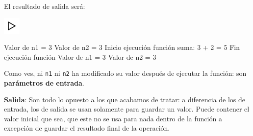 \documentclass[]{book}
\newenvironment{Shaded}{\begin{snugshade}}{\end{snugshade}}
\newcommand{\DataTypeTok}[1]{\textcolor[rgb]{0.13,0.29,0.53}{#1}}
\newcommand{\DecValTok}[1]{\textcolor[rgb]{0.00,0.00,0.81}{#1}}
\newcommand{\SpecialCharTok}[1]{\textcolor[rgb]{0.00,0.00,0.00}{#1}}
\newcommand{\StringTok}[1]{\textcolor[rgb]{0.31,0.60,0.02}{#1}}
\newcommand{\NormalTok}[1]{#1}
\begin{document}
\begin{Shaded}
\end{Shaded}

El resultado de salida será:

\includegraphics{./img/play.png}

\begin{Shaded}
\begin{Highlighting}[]
\NormalTok{Valor de n1 = }\DecValTok{3}
\NormalTok{Valor de n2 = }\DecValTok{3}
\NormalTok{Inicio ejecución función}
\NormalTok{suma: }\DecValTok{3}\NormalTok{ + }\DecValTok{2}\NormalTok{ = }\DecValTok{5}
\NormalTok{Fin ejecución función}
\NormalTok{Valor de n1 = }\DecValTok{3}
\NormalTok{Valor de n2 = }\DecValTok{3}
\end{Highlighting}
\end{Shaded}

Como ves, ni \texttt{n1} ni \texttt{n2} ha modificado su valor después
de ejecutar la función: son \textbf{parámetros de entrada}.

\textbf{Salida}: Son todo lo opuesto a los que acabamos de tratar: a
diferencia de los de entrada, los de salida se usan solamente para
guardar un valor. Puede contener el valor inicial que sea, que este no
se usa para nada dentro de la función a excepción de guardar el
resultado final de la operación.
\end{document}
